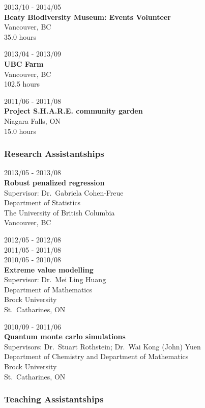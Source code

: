 \documentclass[]{article}
\begin{document}
2013/10 - 2014/05\\
\textbf{Beaty Biodiversity Museum: Events Volunteer}\\
Vancouver, BC\\
35.0 hours

2013/04 - 2013/09\\
\textbf{UBC Farm}\\
Vancouver, BC\\
102.5 hours

2011/06 - 2011/08\\
\textbf{Project S.H.A.R.E. community garden}\\
Niagara Falls, ON\\
15.0 hours

\hypertarget{research-assistantships}{%
\subsubsection{Research Assistantships}\label{research-assistantships}}

2013/05 - 2013/08\\
\textbf{Robust penalized regression}\\
Supervisor: Dr.~Gabriela Cohen-Freue\\
Department of Statistics\\
The University of British Columbia\\
Vancouver, BC

2012/05 - 2012/08\\
2011/05 - 2011/08\\
2010/05 - 2010/08\\
\textbf{Extreme value modelling}\\
Supervisor: Dr.~Mei Ling Huang\\
Department of Mathematics\\
Brock University\\
St.~Catharines, ON

2010/09 - 2011/06\\
\textbf{Quantum monte carlo simulations}\\
Supervisors: Dr.~Stuart Rothstein; Dr.~Wai Kong (John) Yuen\\
Department of Chemistry and Department of Mathematics\\
Brock University\\
St.~Catharines, ON

\hypertarget{teaching-assistantships}{%
\subsubsection{Teaching Assistantships}\label{teaching-assistantships}}
\end{document}
